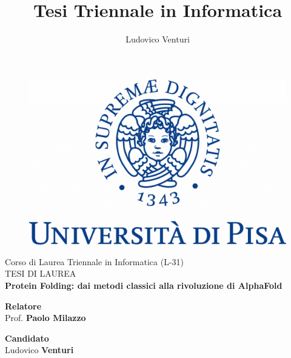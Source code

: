 \documentclass[12pt]{report}
\begin{document}
	
\author{Ludovico Venturi}
\title{Tesi Triennale in Informatica}
	
\begin{titlepage}
	\begin{figure}
		\centering\includegraphics[scale=0.2] {images/UNIPI_Logo.png}
	\end{figure}
	
	\begin{center}
		{\LARGE{ Corso di Laurea Triennale in Informatica (L-31) \\}}
		\vspace{2cm}
		{\Large { TESI DI LAUREA }}\\
		\vspace{2cm}
		{\LARGE { \textbf{Protein Folding: dai metodi classici alla rivoluzione di AlphaFold} }}
	\end{center}
	
	\vspace{2cm}
	
	\begin{minipage}[t]{0.6\textwidth}
		{\large{\textbf{Relatore}\\ Prof. \textbf{Paolo Milazzo}}}
		\vspace{0.5cm}
	\end{minipage}\hfill\begin{minipage}[t]{0.4\textwidth}\raggedleft
		{\large{\textbf{Candidato} \\ Ludovico \textbf{Venturi}\\ }}
	\end{minipage}
	
	\vspace{25mm}
	
\end{titlepage}

\tableofcontents
\clearpage

% 











\printbibliography
\end{document}
